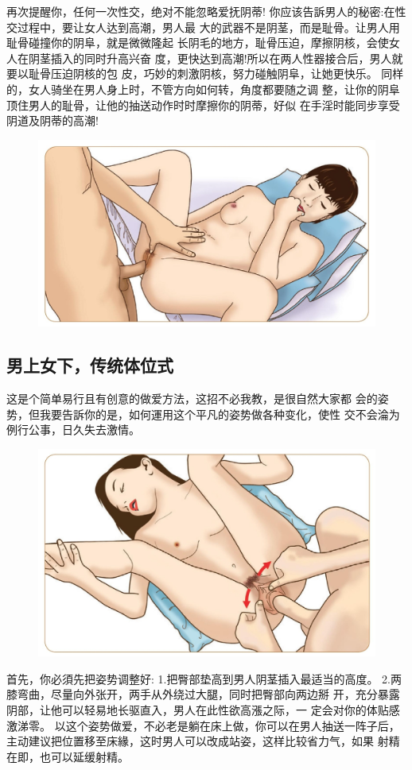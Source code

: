 \documentclass[12pt,UTF8]{ctexbook}
\begin{document}
再次提醒你，任何一次性交，绝对不能忽略爱抚阴蒂!
你应该告訴男人的秘密:在性交过程中，要让女人达到高潮，男人最
大的武器不是阴茎，而是耻骨。让男人用耻骨碰撞你的阴阜，就是微微隆起
长阴毛的地方，耻骨压迫，摩擦阴核，会使女人在阴茎插入的同时升高兴奋
度，更快达到高潮!所以在两人性器接合后，男人就要以耻骨压迫阴核的包
皮，巧妙的刺激阴核，努力碰触阴阜，让她更快乐。
同样的，女人骑坐在男人身上时，不管方向如何转，角度都要随之调
整，让你的阴阜顶住男人的耻骨，让他的抽送动作时时摩擦你的阴蒂，好似
在手淫时能同步享受阴道及阴蒂的高潮!

\begin{figure}[htbp]
	\centering
	\includegraphics[width=0.7\linewidth]{27}
	\caption{}
	\label{fig:1}
\end{figure}

\subsection{男上女下，传统体位式}

这是个简单易行且有创意的做爱方法，这招不必我教，是很自然大家都
会的姿势，但我要告訴你的是，如何運用这个平凡的姿势做各种变化，使性
交不会淪为例行公事，日久失去激情。

\begin{figure}[htbp]
	\centering
	\includegraphics[width=0.7\linewidth]{28}
	\caption{}
	\label{fig:1}
\end{figure}

首先，你必須先把姿势调整好:
1.把臀部垫高到男人阴茎插入最适当的高度。
2.两膝弯曲，尽量向外张开，两手从外绕过大腿，同时把臀部向两边掰
开，充分暴露阴部，让他可以轻易地长驱直入，男人在此性欲高漲之际，一
定会对你的体贴感激涕零。
以这个姿势做爱，不必老是躺在床上做，你可以在男人抽送一阵子后，
主动建议把位置移至床緣，这时男人可以改成站姿，这样比较省力气，如果
射精在即，也可以延缓射精。
\end{document}
